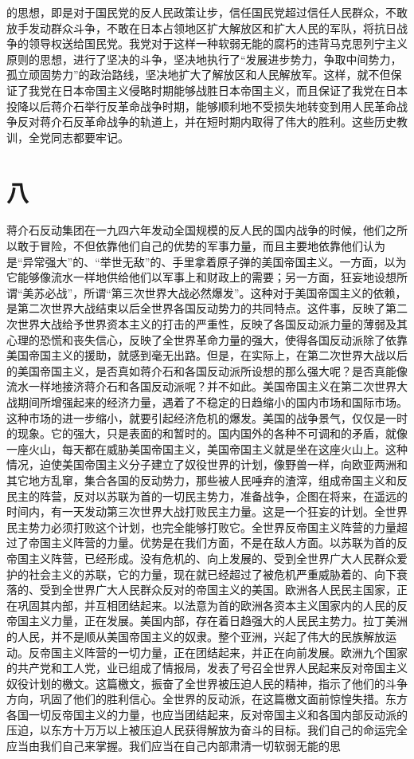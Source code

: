 的思想，即是对于国民党的反人民政策让步，信任国民党超过信任人民群众，不敢放手发动群众斗争，不敢在日本占领地区扩大解放区和扩大人民的军队，将抗日战争的领导权送给国民党。我党对于这样一种软弱无能的腐朽的违背马克思列宁主义原则的思想，进行了坚决的斗争，坚决地执行了“发展进步势力，争取中间势力，孤立顽固势力”的政治路线，坚决地扩大了解放区和人民解放军。这样，就不但保证了我党在日本帝国主义侵略时期能够战胜日本帝国主义，而且保证了我党在日本投降以后蒋介石举行反革命战争时期，能够顺利地不受损失地转变到用人民革命战争反对蒋介石反革命战争的轨道上，并在短时期内取得了伟大的胜利。这些历史教训，全党同志都要牢记。

\section*{八}

蒋介石反动集团在一九四六年发动全国规模的反人民的国内战争的时候，他们之所以敢于冒险，不但依靠他们自己的优势的军事力量，而且主要地依靠他们认为是“异常强大”的、“举世无敌”的、手里拿着原子弹的美国帝国主义。一方面，以为它能够像流水一样地供给他们以军事上和财政上的需要；另一方面，狂妄地设想所谓“美苏必战”，所谓“第三次世界大战必然爆发”。这种对于美国帝国主义的依赖，是第二次世界大战结束以后全世界各国反动势力的共同特点。这件事，反映了第二次世界大战给予世界资本主义的打击的严重性，反映了各国反动派力量的薄弱及其心理的恐慌和丧失信心，反映了全世界革命力量的强大，使得各国反动派除了依靠美国帝国主义的援助，就感到毫无出路。但是，在实际上，在第二次世界大战以后的美国帝国主义，是否真如蒋介石和各国反动派所设想的那么强大呢？是否真能像流水一样地接济蒋介石和各国反动派呢？并不如此。美国帝国主义在第二次世界大战期间所增强起来的经济力量，遇着了不稳定的日趋缩小的国内市场和国际市场。这种市场的进一步缩小，就要引起经济危机的爆发。美国的战争景气，仅仅是一时的现象。它的强大，只是表面的和暂时的。国内国外的各种不可调和的矛盾，就像一座火山，每天都在威胁美国帝国主义，美国帝国主义就是坐在这座火山上。这种情况，迫使美国帝国主义分子建立了奴役世界的计划，像野兽一样，向欧亚两洲和其它地方乱窜，集合各国的反动势力，那些被人民唾弃的渣滓，组成帝国主义和反民主的阵营，反对以苏联为首的一切民主势力，准备战争，企图在将来，在遥远的时间内，有一天发动第三次世界大战打败民主力量。这是一个狂妄的计划。全世界民主势力必须打败这个计划，也完全能够打败它。全世界反帝国主义阵营的力量超过了帝国主义阵营的力量。优势是在我们方面，不是在敌人方面。以苏联为首的反帝国主义阵营，已经形成。没有危机的、向上发展的、受到全世界广大人民群众爱护的社会主义的苏联，它的力量，现在就已经超过了被危机严重威胁着的、向下衰落的、受到全世界广大人民群众反对的帝国主义的美国。欧洲各人民民主国家，正在巩固其内部，并互相团结起来。以法意为首的欧洲各资本主义国家内的人民的反帝国主义力量，正在发展。美国内部，存在着日趋强大的人民民主势力。拉丁美洲的人民，并不是顺从美国帝国主义的奴隶。整个亚洲，兴起了伟大的民族解放运动。反帝国主义阵营的一切力量，正在团结起来，并正在向前发展。欧洲九个国家的共产党和工人党，业已组成了情报局，发表了号召全世界人民起来反对帝国主义奴役计划的檄文。这篇檄文，振奋了全世界被压迫人民的精神，指示了他们的斗争方向，巩固了他们的胜利信心。全世界的反动派，在这篇檄文面前惊惶失措。东方各国一切反帝国主义的力量，也应当团结起来，反对帝国主义和各国内部反动派的压迫，以东方十万万以上被压迫人民获得解放为奋斗的目标。我们自己的命运完全应当由我们自己来掌握。我们应当在自己内部肃清一切软弱无能的思